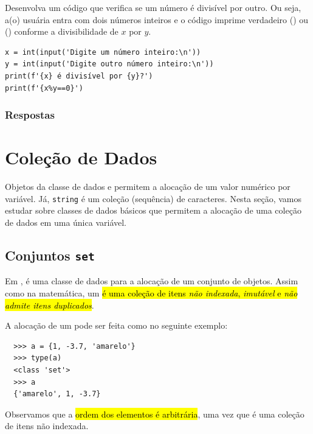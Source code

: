 \begin{exer}
  Desenvolva um código que verifica se um número é divisível por outro. Ou seja, a(o) usuária entra com dois números inteiros e o código imprime verdadeiro ({\PYTHONTrue}) ou ({\PYTHONFalse}) conforme a divisibilidade de $x$ por $y$.
\end{exer}
\begin{resp}

\begin{lstlisting}
x = int(input('Digite um número inteiro:\n'))
y = int(input('Digite outro número inteiro:\n'))
print(f'{x} é divisível por {y}?')
print(f'{x%y==0}')
\end{lstlisting}

\end{resp}

\ifisbook
\subsubsection{Respostas}
\shipoutAnswer
\fi

\section{Coleção de Dados}\label{cap_lingua_sec_colecao}

Objetos da classe de dados \PYTHONint e \PYTHONfloat permitem a alocação de um valor numérico por variável. Já, \texttt{string} é um coleção (sequência) de caracteres. Nesta seção, vamos estudar sobre classes de dados básicos que permitem a alocação de uma coleção de dados em uma única variável.

\subsection{Conjuntos \texttt{set}}

Em {\python}, {\PYTHONset} é uma classe de dados para a alocação de um conjunto de objetos. Assim como na matemática, um \hl{{\PYTHONset} é uma coleção de itens \emph{não indexada}, \emph{imutável} e \emph{não admite itens duplicados}}.

A alocação de um {\PYTHONset} pode ser feita como no seguinte exemplo:

\begin{lstlisting}
  >>> a = {1, -3.7, 'amarelo'}
  >>> type(a)
  <class 'set'>
  >>> a
  {'amarelo', 1, -3.7}
\end{lstlisting}

Observamos que a \hl{ordem dos elementos é arbitrária}, uma vez que {\PYTHONset} é uma coleção de itens não indexada.


